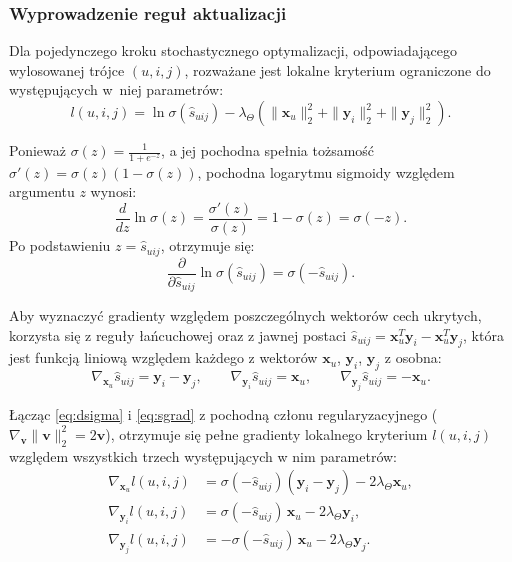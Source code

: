\subsubsection{Wyprowadzenie reguł aktualizacji}

Dla pojedynczego kroku stochastycznego optymalizacji, odpowiadającego wylosowanej trójce $(u,i,j)$, rozważane jest lokalne kryterium ograniczone do występujących w~niej parametrów:
\begin{equation}
    l(u,i,j) = \ln \sigma(\hat{s}_{uij}) - \lambda_\Theta \left( \|\mathbf{x}_u\|_2^2 + \|\mathbf{y}_i\|_2^2 + \|\mathbf{y}_j\|_2^2 \right).
\end{equation}

Ponieważ $\sigma(z) = \frac{1}{1+e^{-z}}$, a jej pochodna spełnia tożsamość $\sigma'(z) = \sigma(z)(1-\sigma(z))$, pochodna logarytmu sigmoidy względem argumentu $z$ wynosi:
\begin{equation}
    \frac{d}{dz} \ln \sigma(z) = \frac{\sigma'(z)}{\sigma(z)} = 1 - \sigma(z) = \sigma(-z).
\end{equation}
Po podstawieniu $z = \hat{s}_{uij}$, otrzymuje się:
\begin{equation}
    \frac{\partial}{\partial \hat{s}_{uij}} \ln \sigma(\hat{s}_{uij}) = \sigma(-\hat{s}_{uij}).
    \label{eq:dsigma}
\end{equation}

Aby wyznaczyć gradienty względem poszczególnych wektorów cech ukrytych, korzysta się z reguły łańcuchowej oraz z jawnej postaci $\hat{s}_{uij} = \mathbf{x}_u^T\mathbf{y}_i - \mathbf{x}_u^T\mathbf{y}_j$, która jest funkcją liniową względem każdego z wektorów $\mathbf{x}_u$, $\mathbf{y}_i$, $\mathbf{y}_j$ z osobna:
\begin{equation}
    \nabla_{\mathbf{x}_u} \hat{s}_{uij} = \mathbf{y}_i - \mathbf{y}_j, \qquad
    \nabla_{\mathbf{y}_i} \hat{s}_{uij} = \mathbf{x}_u, \qquad
    \nabla_{\mathbf{y}_j} \hat{s}_{uij} = -\mathbf{x}_u.
    \label{eq:sgrad}
\end{equation}

Łącząc \eqref{eq:dsigma} i \eqref{eq:sgrad} z pochodną członu regularyzacyjnego ($\nabla_{\mathbf{v}} \|\mathbf{v}\|_2^2 = 2\mathbf{v}$), otrzymuje się pełne gradienty lokalnego kryterium $l(u,i,j)$ względem wszystkich trzech występujących w nim parametrów:
\begin{align}
    \nabla_{\mathbf{x}_u} l(u,i,j) &= \sigma(-\hat{s}_{uij})(\mathbf{y}_i - \mathbf{y}_j) - 2\lambda_\Theta \mathbf{x}_u, \label{eq:gradxu}\\
    \nabla_{\mathbf{y}_i} l(u,i,j) &= \sigma(-\hat{s}_{uij})\,\mathbf{x}_u - 2\lambda_\Theta \mathbf{y}_i, \label{eq:gradyi}\\
    \nabla_{\mathbf{y}_j} l(u,i,j) &= -\sigma(-\hat{s}_{uij})\,\mathbf{x}_u - 2\lambda_\Theta \mathbf{y}_j. \label{eq:gradyj}
\end{align}

